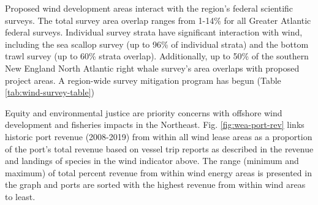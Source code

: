 \documentclass[
  10pt,
]{article}
\let\origtable\table
\let\endorigtable\endtable
\renewenvironment{table}[1][2] {
    \expandafter\origtable\expandafter[H]
} {
    \endorigtable
}
\begin{document}
Proposed wind development areas interact with the region's federal
scientific surveys. The total survey area overlap ranges from 1-14\% for
all Greater Atlantic federal surveys. Individual survey strata have
significant interaction with wind, including the sea scallop survey (up
to 96\% of individual strata) and the bottom trawl survey (up to 60\%
strata overlap). Additionally, up to 50\% of the southern New England
North Atlantic right whale survey's area overlaps with proposed project
areas. A region-wide survey mitigation program has begun (Table
\ref{tab:wind-survey-table})

\begin{table}

\caption{\label{tab:wind-survey-table}Survey mitigation planning.}
\centering
{}
\end{table}

Equity and environmental justice are priority concerns with offshore
wind development and fisheries impacts in the Northeast. Fig.
\ref{fig:wea-port-rev} links historic port revenue (2008-2019) from
within all wind lease areas as a proportion of the port's total revenue
based on vessel trip reports as described in the revenue and landings of
species in the wind indicator above. The range (minimum and maximum) of
total percent revenue from within wind energy areas is presented in the
graph and ports are sorted with the highest revenue from within wind
areas to least.
\end{document}
